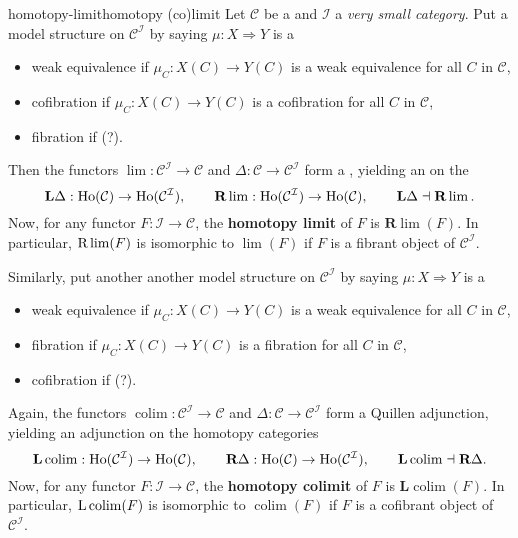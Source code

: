 \begin{topic}{homotopy-limit}{homotopy (co)limit}
    Let $\mathcal{C}$ be a  and $\mathcal{I}$ a \textit{very small category}. Put a model structure on $\mathcal{C}^\mathcal{I}$ by saying $\mu : X \Rightarrow Y$ is a 
    \begin{itemize}
        \item weak equivalence if $\mu_C : X(C) \to Y(C)$ is a weak equivalence for all $C$ in $\mathcal{C}$,
        \item cofibration if $\mu_C : X(C) \to Y(C)$ is a cofibration for all $C$ in $\mathcal{C}$,
        \item fibration if (?).
    \end{itemize}
    Then the functors $\lim : \mathcal{C}^\mathcal{I} \to \mathcal{C}$ and $\Delta : \mathcal{C} \to \mathcal{C}^\mathcal{I}$ form a , yielding an  on the 
    \[ \textbf{L} \Delta : \textup{Ho}(\mathcal{C}) \to \textup{Ho}(\mathcal{C}^\mathcal{I}), \qquad \textbf{R}\lim : \textup{Ho}(\mathcal{C}^\mathcal{I}) \to \textup{Ho}(\mathcal{C}), \qquad \textbf{L} \Delta \dashv \textbf{R} \lim . \]
     Now, for any functor $F : \mathcal{I} \to \mathcal{C}$, the \textbf{homotopy limit} of $F$ is $\textbf{R}\lim(F)$. In particular, $\textup{R}\lim(F)$ is isomorphic to $\lim(F)$ if $F$ is a fibrant object of $\mathcal{C}^\mathcal{I}$.
     
     Similarly, put another another model structure on $\mathcal{C}^\mathcal{I}$ by saying $\mu : X \Rightarrow Y$ is a
     \begin{itemize}
        \item weak equivalence if $\mu_C : X(C) \to Y(C)$ is a weak equivalence for all $C$ in $\mathcal{C}$,
        \item fibration if $\mu_C : X(C) \to Y(C)$ is a fibration for all $C$ in $\mathcal{C}$,
        \item cofibration if (?).
    \end{itemize}
    Again, the functors $\operatorname{colim} : \mathcal{C}^\mathcal{I} \to \mathcal{C}$ and $\Delta : \mathcal{C} \to \mathcal{C}^\mathcal{I}$ form a Quillen adjunction, yielding an adjunction on the homotopy categories
    \[ \textbf{L}\operatorname{colim} : \textup{Ho}(\mathcal{C}^\mathcal{I}) \to \textup{Ho}(\mathcal{C}), \qquad \textbf{R} \Delta : \textup{Ho}(\mathcal{C}) \to \textup{Ho}(\mathcal{C}^\mathcal{I}), \qquad \textbf{L} \operatorname{colim} \dashv \textbf{R} \Delta . \]
    Now, for any functor $F : \mathcal{I} \to \mathcal{C}$, the \textbf{homotopy colimit} of $F$ is $\textbf{L}\operatorname{colim}(F)$. In particular, $\textup{L}\operatorname{colim}(F)$ is isomorphic to $\operatorname{colim}(F)$ if $F$ is a cofibrant object of $\mathcal{C}^\mathcal{I}$.
\end{topic}

